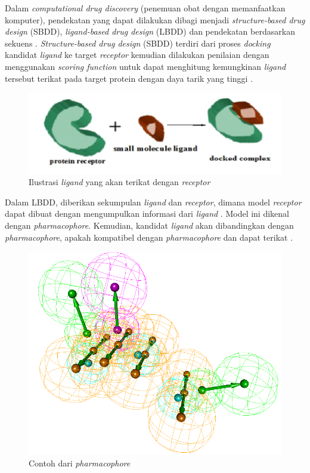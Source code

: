 Dalam \textit{computational drug discovery} (penemuan obat dengan memanfaatkan komputer), pendekatan yang dapat dilakukan dibagi menjadi \textit{structure-based drug design} (SBDD), \textit{ligand-based drug design} (LBDD) dan pendekatan berdasarkan sekuens \cite{reviewCADD}. \textit{Structure-based drug design} (SBDD) terdiri dari proses \textit{docking} kandidat \textit{ligand} ke target \textit{receptor} kemudian dilakukan penilaian dengan menggunakan \textit{scoring function} untuk dapat menghitung kemungkinan \textit{ligand} tersebut terikat pada target protein dengan daya tarik yang tinggi \cite{rankingSBDD}. 
\begin{figure}
	\centering
	\includegraphics {molecular_docking.png}
	\caption{Ilustrasi \textit{ligand} yang akan terikat dengan \textit{receptor} \cite{gambar MolecularDocking}}
\end{figure}   
Dalam LBDD, diberikan sekumpulan \textit{ligand} dan \textit{receptor}, dimana model \textit{receptor} dapat dibuat dengan mengumpulkan informasi dari \textit{ligand} \cite{Drugdesign}. Model ini dikenal dengan \textit{pharmacophore}. Kemudian, kandidat \textit{ligand} akan dibandingkan dengan \textit{pharmacophore}, apakah kompatibel dengan \textit{pharmacophore} dan dapat terikat \cite{MolecularDocking}.
\begin{figure}
	\centering
	\includegraphics [scale=0.3]{pharmacophore.png}
	\caption{Contoh dari \textit{pharmacophore} \cite{pharmacophore}}
\end{figure}  


